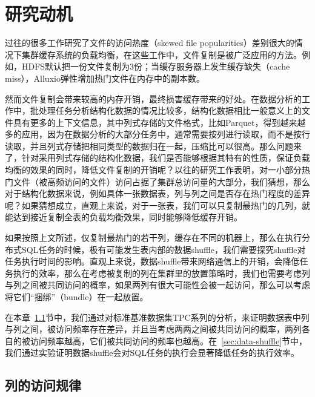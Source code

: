 
\chapter{研究动机}
\label{chp:motivation}


\par 过往的很多工作研究了文件的访问热度（skewed file popularities）差别很大的情况下集群缓存系统的负载均衡，在这些工作中，文件复制是被广泛应用的方法。例如，HDFS默认把一份文件复制为3份；当缓存服务器上发生缓存缺失（cache miss），Alluxio弹性增加热门文件在内存中的副本数。

\par 然而文件复制会带来较高的内存开销，最终损害缓存带来的好处。在数据分析的工作中，批处理任务分析结构化数据的情况比较多，结构化数据相比一般意义上的文件具有更多的上下文信息，其中列式存储的文件格式，比如Parquet\cite{parquet}，得到越来越多的应用，因为在数据分析的大部分任务中，通常需要按列进行读取，而不是按行读取，并且列式存储把相同类型的数据归在一起，压缩比可以很高。那么问题来了，针对采用列式存储的结构化数据，我们是否能够根据其特有的性质，保证负载均衡的效果的同时，降低文件复制的开销呢？以往的研究工作表明，对一小部分热门文件（被高频访问的文件）访问占据了集群总访问量的大部分，我们猜想，那么对于结构化数据来说，例如具体一张数据表，列与列之间是否存在热门程度的差异呢？如果猜想成立，直观上来说，对于一张表，我们可以只复制最热门的几列，就能达到接近复制全表的负载均衡效果，同时能够降低缓存开销。

\par 如果按照上文所述，仅复制最热门的若干列，缓存在不同的机器上，那么在执行分布式SQL任务的时候，极有可能发生表内部的数据shuffle，我们需要探究shuffle对任务执行时间的影响。直观上来说，数据shuffle带来网络通信上的开销，会降低任务执行的效率，那么在考虑被复制的列在集群里的放置策略时，我们也需要考虑列与列之间被共同访问的概率，如果两列有很大可能性会被一起访问，那么可以考虑将它们“捆绑”（bundle）在一起放置。

\par 在本章~\ref{sec:col-access}节中，我们通过对标准基准数据集TPC系列的分析，来证明数据表中列与列之间，被访问频率存在差异，并且当考虑两两之间被共同访问的概率，两列各自的被访问频率越高，它们被共同访问的频率也越高。在~\ref{sec:data-shuffle}节中，我们通过实验证明数据shuffle会对SQL任务的执行会显著降低任务的执行效率。

\section{列的访问规律}
\label{sec:col-access}

